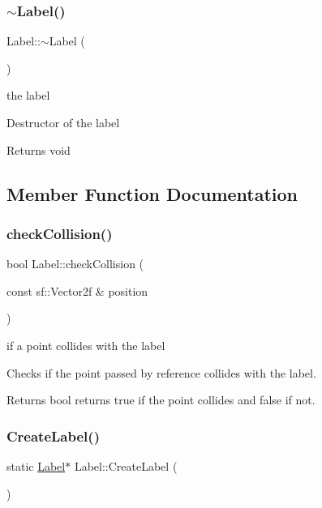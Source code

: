 \subsubsection{\texorpdfstring{$\sim$\+Label()}{~Label()}}
{\footnotesize\ttfamily Label\+::$\sim$\+Label (\begin{DoxyParamCaption}{ }\end{DoxyParamCaption})}

the label

Destructor of the label

\begin{DoxyReturn}{Returns}
void 
\end{DoxyReturn}


\subsection{Member Function Documentation}
\mbox{\label{class_label_ad79f141fe2f04fd095b9507cac2667a6}} 
\subsubsection{\texorpdfstring{check\+Collision()}{checkCollision()}}
{\footnotesize\ttfamily bool Label\+::check\+Collision (\begin{DoxyParamCaption}\item[{const sf\+::\+Vector2f \&}]{position }\end{DoxyParamCaption})}

if a point collides with the label

Checks if the point passed by reference collides with the label.

\begin{DoxyReturn}{Returns}
bool returns true if the point collides and false if not. 
\end{DoxyReturn}
\mbox{\label{class_label_a9331db7ea12bb0bfa69910b9aa2229a4}} 
\subsubsection{\texorpdfstring{Create\+Label()}{CreateLabel()}}
{\footnotesize\ttfamily static \hyperlink{class_label}{Label}$\ast$ Label\+::\+Create\+Label (\begin{DoxyParamCaption}{ }\end{DoxyParamCaption})\hspace{0.3cm}{\ttfamily [static]}}

